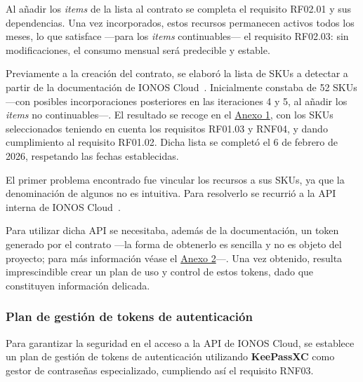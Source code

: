 Al añadir los \textit{items} de la lista al contrato se completa el requisito RF02.01 y sus dependencias. Una vez incorporados, estos recursos permanecen activos todos los meses, lo que satisface ---para los \textit{items} continuables--- el requisito RF02.03: sin modificaciones, el consumo mensual será predecible y estable.

Previamente a la creación del contrato, se elaboró la lista de SKUs a detectar a partir de la documentación de IONOS Cloud~\cite{billing-IONOSCloud}. Inicialmente constaba de 52 SKUs ---con posibles incorporaciones posteriores en las iteraciones 4 y 5, al añadir los \textit{items} no continuables---. El resultado se recoge en el \hyperref[anexo:Lista-de-SKUs]{Anexo 1}, con los SKUs seleccionados teniendo en cuenta los requisitos RF01.03 y RNF04, y dando cumplimiento al requisito RF01.02. Dicha lista se completó el 6 de febrero de 2026, respetando las fechas establecidas.

\vspace{0.5cm}

El primer problema encontrado fue vincular los recursos a sus SKUs, ya que la denominación de algunos no es intuitiva. Para resolverlo se recurrió a la API interna de IONOS Cloud~\cite{billing-IONOSCloud}.

Para utilizar dicha API se necesitaba, además de la documentación, un token generado por el contrato ---la forma de obtenerlo es sencilla y no es objeto del proyecto; para más información véase el \hyperref[anexo:crear-cuenta-token]{Anexo 2}---. Una vez obtenido, resulta imprescindible crear un plan de uso y control de estos tokens, dado que constituyen información delicada.

\subsubsection{Plan de gestión de tokens de autenticación}
\label{iteraciones:gestion-tokens}
Para garantizar la seguridad en el acceso a la API de IONOS Cloud, se establece un plan de gestión de tokens de autenticación utilizando \textbf{KeePassXC} como gestor de contraseñas especializado, cumpliendo así el requisito RNF03.

